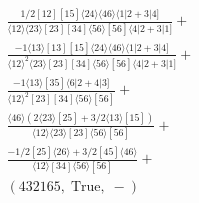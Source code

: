 \documentclass[varwidth, border=5pt]{standalone}
\begin{document}
\begin{my}
$\begin{gathered}
\scriptscriptstyle\frac{1/2[12][15]⟨24⟩⟨46⟩⟨1|2+3|4]}{⟨12⟩⟨23⟩[23][34]⟨56⟩[56]⟨4|2+3|1]}+\\
\scriptscriptstyle\frac{-1⟨13⟩[13][15]⟨24⟩⟨46⟩⟨1|2+3|4]}{⟨12⟩^2⟨23⟩[23][34]⟨56⟩[56]⟨4|2+3|1]}+\\
\scriptscriptstyle\frac{-1⟨13⟩[35]⟨6|2+4|3]}{⟨12⟩^2[23][34]⟨56⟩[56]}+\\
\scriptscriptstyle\frac{⟨46⟩(2⟨23⟩[25]+3/2⟨13⟩[15])}{⟨12⟩⟨23⟩[23]⟨56⟩[56]}+\\
\scriptscriptstyle\frac{-1/2[25]⟨26⟩+3/2[45]⟨46⟩}{⟨12⟩[34]⟨56⟩[56]}+\\
\scriptscriptstyle(432165,\;\text{True},\;-)\phantom{+}
\end{gathered}$
\end{my}
\end{document}
